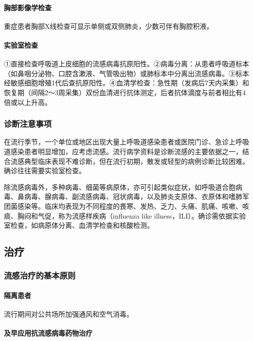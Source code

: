 \paragraph{胸部影像学检查}

重症患者胸部X线检查可显示单侧或双侧肺炎，少数可伴有胸腔积液。

\paragraph{实验室检查}

①直接检查呼吸道上皮细胞的流感病毒抗原阳性。②病毒分离：从患者呼吸道标本（如鼻咽分泌物、口腔含漱液、气管吸出物）或肺标本中分离出流感病毒。③标本经敏感细胞增殖1代后查抗原阳性。④血清学检查：急性期（发病后7天内采集）和恢复期（间隔2～3周采集）双份血清进行抗体测定，后者抗体滴度与前者相比有4倍或以上升高。

\subsubsection{诊断注意事项}

在流行季节，一个单位或地区出现大量上呼吸道感染患者或医院门诊、急诊上呼吸道感染患者明显增加，应考虑流感。流行病学资料是诊断流感的主要依据之一，结合流感典型临床表现不难诊断，但在流行初期，散发或轻型的病例诊断比较困难。确诊往往需要实验室检查。

除流感病毒外，多种病毒、细菌等病原体，亦可引起类似症状，如呼吸道合胞病毒、鼻病毒、腺病毒、副流感病毒、冠状病毒，以及肺炎支原体、衣原体和嗜肺军团菌感染等。临床均表现为不同程度的畏寒、发热、乏力、头痛、肌痛、咳嗽、咳痰、胸闷和气促，称为流感样疾病（influenza
like
illness，ILI）。确诊需依据实验室检查，如病原体分离、血清学检查和核酸检测。

\subsection{治疗}

\subsubsection{流感治疗的基本原则}

\paragraph{隔离患者}

流行期间对公共场所加强通风和空气消毒。

\paragraph{及早应用抗流感病毒药物治疗}


